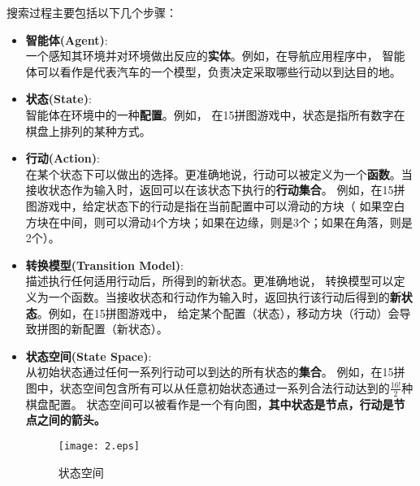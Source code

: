 搜索过程主要包括以下几个步骤：
\begin{itemize}
    \item \textbf{智能体(Agent)}:\\一个感知其环境并对环境做出反应的\textbf{实体}。例如，在导航应用程序中，
    智能体可以看作是代表汽车的一个模型，负责决定采取哪些行动以到达目的地。\smallskip
    \item \textbf{状态(State)}:\\智能体在环境中的一种\textbf{配置}。例如，
    在15拼图游戏中，状态是指所有数字在棋盘上排列的某种方式。\smallskip
    \item \textbf{行动(Action)}:\\在某个状态下可以做出的选择。更准确地说，行动可以被定义为一个\textbf{函数}。当接收状态作为输入时，返回可以在该状态下执行的\textbf{行动集合}。
    例如，在15拼图游戏中，给定状态下的行动是指在当前配置中可以滑动的方块（
    如果空白方块在中间，则可以滑动4个方块；如果在边缘，则是3个；如果在角落，则是2个）。\smallskip
    \item \textbf{转换模型(Transition Model)}:\\描述执行任何适用行动后，所得到的新状态。更准确地说，
    转换模型可以定义为一个函数。当接收状态和行动作为输入时，返回执行该行动后得到的\textbf{新状态}。例如，在15拼图游戏中，
    给定某个配置（状态），移动方块（行动）会导致拼图的新配置（新状态）。\smallskip
    \item \textbf{状态空间(State Space)}:\\从初始状态通过任何一系列行动可以到达的所有状态的\textbf{集合}。
    例如，在15拼图中，状态空间包含所有可以从任意初始状态通过一系列合法行动达到的$\frac{16!}{2} $种棋盘配置。
    状态空间可以被看作是一个有向图，\textbf{其中状态是节点，行动是节点之间的箭头。}\smallskip
    \begin{figure}[htbp]
        \centering
         \texttt{[image: 2.eps]}
         \caption{状态空间}
         \label{zhuangtaikongjian}
      \end{figure}
\end{itemize}
